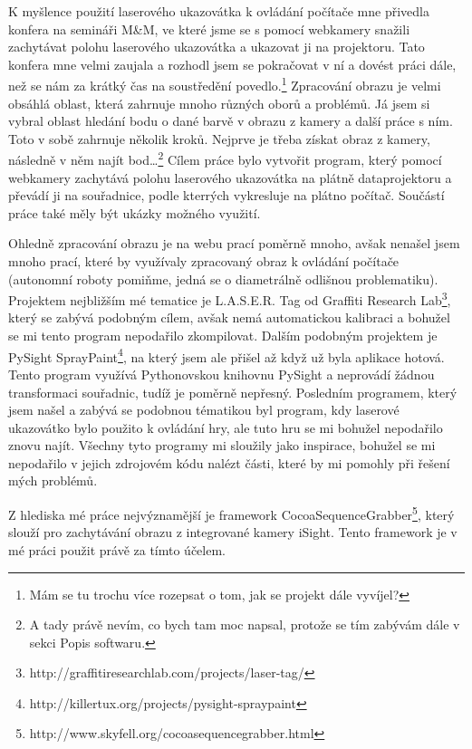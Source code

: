 \documentclass[twoside,12pt]{article}
\begin{document}
K myšlence použití laserového ukazovátka k ovládání počítače mne přivedla konfera na semináři M\&M, ve které jsme se s pomocí webkamery snažili zachytávat polohu laserového ukazovátka a ukazovat ji na projektoru. Tato konfera mne velmi zaujala a rozhodl jsem se pokračovat v ní a dovést práci dále, než se nám za krátký čas na soustředění povedlo.\footnote{Mám se tu trochu více rozepsat o tom, jak se projekt dále vyvíjel?}
Zpracování obrazu je velmi obsáhlá oblast, která zahrnuje mnoho různých oborů a problémů. Já jsem si vybral oblast hledání bodu o dané barvě v obrazu z kamery a další práce s ním. Toto v sobě zahrnuje několik kroků. Nejprve je třeba získat obraz z kamery, následně v něm najít bod\dots\footnote{A tady právě nevím, co bych tam moc napsal, protože se tím zabývám dále v sekci Popis softwaru.}
Cílem práce bylo vytvořit program, který pomocí webkamery zachytává polohu laserového ukazovátka na plátně dataprojektoru a převádí ji na souřadnice, podle kterrých vykresluje na plátno počítač. Součástí práce také měly být ukázky možného využití.

Ohledně zpracování obrazu je na webu prací poměrně mnoho, avšak nenašel jsem mnoho prací, které by využívaly zpracovaný obraz k ovládání počítače (autonomní roboty pomiňme, jedná se o diametrálně odlišnou problematiku). Projektem nejbližším mé tematice je L.A.S.E.R. Tag od Graffiti Research Lab\footnote{http://graffitiresearchlab.com/projects/laser-tag/}, který se zabývá podobným cílem, avšak nemá automatickou kalibraci a bohužel se mi tento program nepodařilo zkompilovat. Dalším podobným projektem je PySight SprayPaint\footnote{http://killertux.org/projects/pysight-spraypaint}, na který jsem ale přišel až když už byla aplikace hotová. Tento program využívá Pythonovskou knihovnu PySight a neprovádí žádnou transformaci souřadnic, tudíž je poměrně nepřesný. Posledním programem, který jsem našel a zabývá se podobnou tématikou byl program, kdy laserové ukazovátko bylo použito k ovládání hry, ale tuto hru se mi bohužel nepodařilo znovu najít. Všechny tyto programy mi sloužily jako inspirace, bohužel se mi nepodařilo v jejich zdrojovém kódu nalézt části, které by mi pomohly při řešení mých problémů. 

Z hlediska mé práce nejvýznamější je framework CocoaSequenceGrabber\footnote{http://www.skyfell.org/cocoasequencegrabber.html}, který slouží pro zachytávání obrazu z integrované kamery iSight. Tento framework je v mé práci použit právě za tímto účelem.
\end{document}
